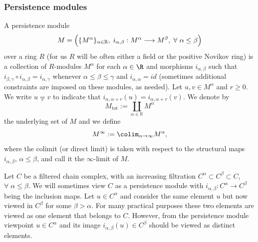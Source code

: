 \subsubsection{Persistence modules}
A persistence module
$$M = \Bigl( \{M^{\alpha}\}_{\alpha \in \mathbb{R}}, \; i_{\alpha,
  \beta}: M^{\alpha} \longrightarrow M^{\beta}, \; \forall \ \alpha
\leq \beta \Bigr)$$ over a ring $R$ (for us $R$ will be often
  either a field or the positive Novikov ring) is a collection of
$R$-modules $M^{\alpha}$ for each $\alpha\in\R$ and
morphisms $i_{\alpha,\beta}$ such that
$i_{\beta,\gamma}\circ i_{\alpha,\beta}=i_{\alpha,\gamma}$ whenever
$\alpha\leq\beta\leq\gamma$ and $i_{\alpha,\alpha}=id$ (sometimes
additional constraints are imposed on these modules, as needed).  Let $u, v \in M^{\alpha}$ and $r \geq 0$. We write
  $u \underset{r}{=}v$ to indicate that $i_{\alpha,\alpha+r}(u) = i_{\alpha,\alpha+r}(v)$.
%
We  denote by
$$M_{\text{tot}} := \coprod_{\alpha \in \mathbb{R}} M^{\alpha}$$ the underlying set
of $M$ %
and we define $$M^{\infty} := \colim_{\alpha \to \infty} M^{\alpha},$$
where the colimit (or direct limit) is taken with respect to the
structural maps $i_{\alpha, \beta}$, $\alpha \leq \beta$, and call it
the $\infty$-limit of $M$.

\begin{rem}
  Let $C$ be a filtered chain complex, with an increasing filtration
  $C^{\alpha} \subset C^{\beta} \subset C$,
  $\forall \; \alpha \leq \beta$. We will sometimes view $C$ as a
  persistence module with
  $i_{\alpha, \beta}: C^{\alpha} \longrightarrow C^{\beta}$ being the
  inclusion maps. Let $u \in C^{\alpha}$ and consider the same
  element $u$ but now viewed in $C^{\beta}$ for some $\beta > \alpha$.
  For many practical purposes these two elements are viewed as one
  element that belongs to $C$. However, from the persistence module
  viewpoint $u \in C^{\alpha}$ and its image
  $i_{\alpha, \beta}(u) \in C^{\beta}$ should be viewed as distinct
  elements. \end{rem}


